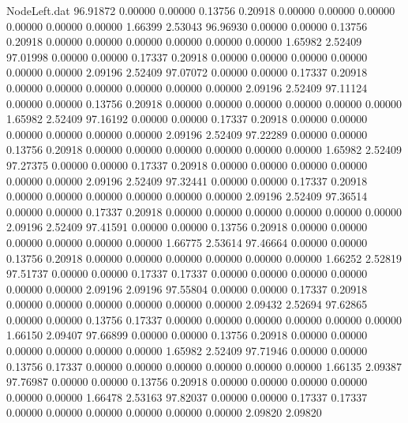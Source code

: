 \begin{filecontents}{NodeLeft.dat}
  96.91872    0.00000    0.00000     0.13756    0.20918    0.00000    0.00000    0.00000    0.00000    0.00000    0.00000    1.66399    2.53043
  96.96930    0.00000    0.00000     0.13756    0.20918    0.00000    0.00000    0.00000    0.00000    0.00000    0.00000    1.65982    2.52409
  97.01998    0.00000    0.00000     0.17337    0.20918    0.00000    0.00000    0.00000    0.00000    0.00000    0.00000    2.09196    2.52409
  97.07072    0.00000    0.00000     0.17337    0.20918    0.00000    0.00000    0.00000    0.00000    0.00000    0.00000    2.09196    2.52409
  97.11124    0.00000    0.00000     0.13756    0.20918    0.00000    0.00000    0.00000    0.00000    0.00000    0.00000    1.65982    2.52409
  97.16192    0.00000    0.00000     0.17337    0.20918    0.00000    0.00000    0.00000    0.00000    0.00000    0.00000    2.09196    2.52409
  97.22289    0.00000    0.00000     0.13756    0.20918    0.00000    0.00000    0.00000    0.00000    0.00000    0.00000    1.65982    2.52409
  97.27375    0.00000    0.00000     0.17337    0.20918    0.00000    0.00000    0.00000    0.00000    0.00000    0.00000    2.09196    2.52409
  97.32441    0.00000    0.00000     0.17337    0.20918    0.00000    0.00000    0.00000    0.00000    0.00000    0.00000    2.09196    2.52409
  97.36514    0.00000    0.00000     0.17337    0.20918    0.00000    0.00000    0.00000    0.00000    0.00000    0.00000    2.09196    2.52409
  97.41591    0.00000    0.00000     0.13756    0.20918    0.00000    0.00000    0.00000    0.00000    0.00000    0.00000    1.66775    2.53614
  97.46664    0.00000    0.00000     0.13756    0.20918    0.00000    0.00000    0.00000    0.00000    0.00000    0.00000    1.66252    2.52819
  97.51737    0.00000    0.00000     0.17337    0.17337    0.00000    0.00000    0.00000    0.00000    0.00000    0.00000    2.09196    2.09196
  97.55804    0.00000    0.00000     0.17337    0.20918    0.00000    0.00000    0.00000    0.00000    0.00000    0.00000    2.09432    2.52694
  97.62865    0.00000    0.00000     0.13756    0.17337    0.00000    0.00000    0.00000    0.00000    0.00000    0.00000    1.66150    2.09407
  97.66899    0.00000    0.00000     0.13756    0.20918    0.00000    0.00000    0.00000    0.00000    0.00000    0.00000    1.65982    2.52409
  97.71946    0.00000    0.00000     0.13756    0.17337    0.00000    0.00000    0.00000    0.00000    0.00000    0.00000    1.66135    2.09387
  97.76987    0.00000    0.00000     0.13756    0.20918    0.00000    0.00000    0.00000    0.00000    0.00000    0.00000    1.66478    2.53163
  97.82037    0.00000    0.00000     0.17337    0.17337    0.00000    0.00000    0.00000    0.00000    0.00000    0.00000    2.09820    2.09820

\end{filecontents}
